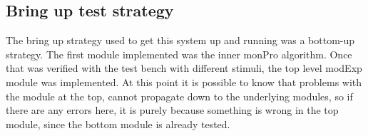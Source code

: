 \subsection{Bring up test strategy}
The bring up strategy used to get this system up and running was a bottom-up strategy. The first module
implemented was the inner monPro algorithm. Once that was verified with the test bench with different
stimuli, the top level modExp module was implemented. At this point it is possible to know that
problems with the module at the top, cannot propagate down to the underlying modules, so if there are
any errors here, it is purely because something is wrong in the top module, since the bottom module is
already tested.
